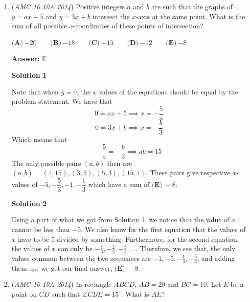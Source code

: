 \begin{enumerate}
 0000064000+

 0000006400+

 0000000640+

 0000000064=

 7111111104

 You see that is just 7 - M 1s- 04

 There have to be 1000 - 7 - 4 = 989 1s.

 When you divide 7111... by 8, the answer, since 7 < 8, is 1 digit less.

 So we get 992 - 1 = 991, which is $\fbox{(D)}$. ~vedantinity

 


	\item (\textit{AMC 10 10A 2014}) Positive integers $a$ and $b$ are such that the graphs of $y=ax+5$ and $y=3x+b$ intersect the $x$-axis at the same point. What is the sum of all possible $x$-coordinates of these points of intersection?


 $\textbf{(A)}\ {-20}\qquad\textbf{(B)}\ {-18}\qquad\textbf{(C)}\ {-15}\qquad\textbf{(D)}\ {-12}\qquad\textbf{(E)}\ {-8}$

 \textbf{Answer: }E



\textbf{Solution 1}

Note that when $y=0$, the $x$ values of the equations should be equal by the problem statement. We have that
 \[0 = ax + 5 \implies x = -\dfrac{5}{a}\] 
 \[0 = 3x+b \implies x= -\dfrac{b}{3}\]Which means that 
 \[-\dfrac{5}{a} = -\dfrac{b}{3} \implies ab = 15\]The only possible pairs $(a,b)$ then are $(a,b) = (1,15), (3,5), (5,3), (15, 1)$. These pairs give respective $x$-values of $-5, -\dfrac{5}{3}, -1, -\dfrac{1}{3}$ which have a sum of $\boxed{\textbf{(E)} \: -8}$.

 



\textbf{Solution 2}

Using a part of what we got from Solution 1, we notice that the value of $x$ cannot be less than $-5$. We also know for the first equation that the values of $x$ have to be $5$ divided by something. Furthermore, for the second equation, the values of $x$ can only be $-\frac13,-\frac23,-\frac33, \dots$. Therefore, we see that, the only values common between the two sequences are $-1, -5, -\frac13,-\frac53$, and adding them up, we get our final answer, $\boxed{\textbf{(E)} \: -8}$.

 


	\item (\textit{AMC 10 10A 2014}) In rectangle $ABCD$, $AB=20$ and $BC=10$. Let $E$ be a point on $\overline{CD}$ such that $\angle CBE=15^\circ$. What is $AE$?



\end{enumerate}

